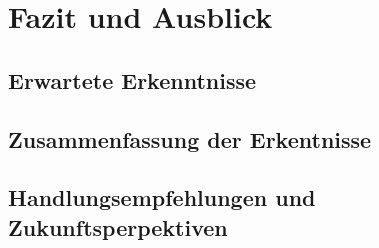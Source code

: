 \chapter{Fazit und Ausblick}

\section{Erwartete Erkenntnisse}


\section{Zusammenfassung der Erkentnisse}


\section{Handlungsempfehlungen und Zukunftsperpektiven}
